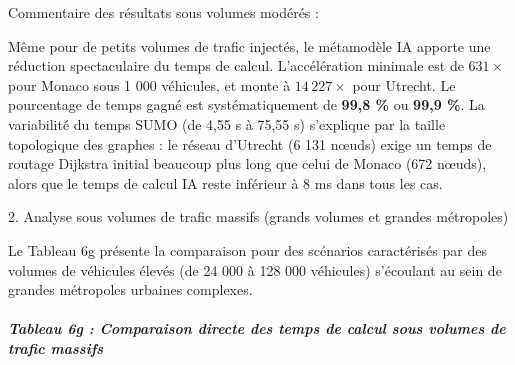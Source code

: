 \documentclass[10pt, a4paper]{article}
\begin{document}
Commentaire des résultats sous volumes modérés :

Même pour de petits volumes de trafic injectés, le métamodèle IA apporte
une réduction spectaculaire du temps de calcul. L'accélération minimale
est de \(631\times\) pour Monaco sous 1 000 véhicules, et monte à
\(14\,227\times\) pour Utrecht. Le pourcentage de temps gagné est
systématiquement de \textbf{99,8 \%} ou \textbf{99,9 \%}. La variabilité
du temps SUMO (de 4,55 s à 75,55 s) s'explique par la taille topologique
des graphes : le réseau d'Utrecht (6 131 nœuds) exige un temps de
routage Dijkstra initial beaucoup plus long que celui de Monaco (672
nœuds), alors que le temps de calcul IA reste inférieur à 8 ms dans tous
les cas.

2. Analyse sous volumes de trafic massifs (grands volumes et grandes
métropoles)

Le Tableau 6g présente la comparaison pour des scénarios caractérisés
par des volumes de véhicules élevés (de 24 000 à 128 000 véhicules)
s'écoulant au sein de grandes métropoles urbaines complexes.

\subparagraph{Tableau 6g : Comparaison directe des temps de calcul sous
volumes de trafic
massifs}\label{tableau-6g-comparaison-directe-des-temps-de-calcul-sous-volumes-de-trafic-massifs}
\end{document}
